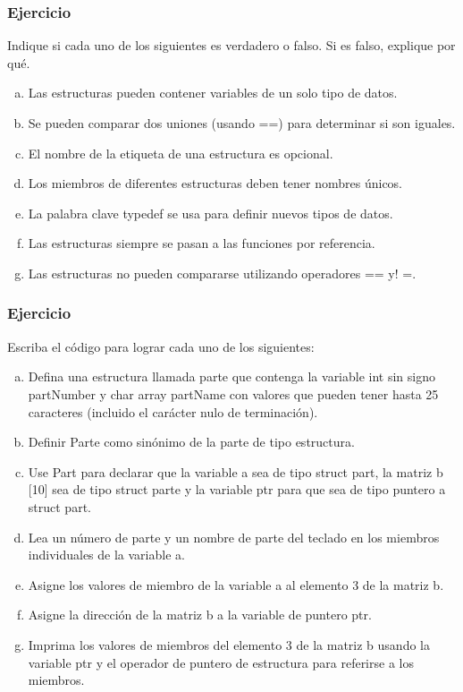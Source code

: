 \subsubsection{Ejercicio}
Indique si cada uno de los siguientes es verdadero o falso. Si es falso, explique por qué.
\begin{enumerate}[a)]
  \item Las estructuras pueden contener variables de un solo tipo de datos.
  \item Se pueden comparar dos uniones (usando ==) para determinar si son iguales.
  \item El nombre de la etiqueta de una estructura es opcional.
  \item Los miembros de diferentes estructuras deben tener nombres únicos.
  \item La palabra clave typedef se usa para definir nuevos tipos de datos.
  \item Las estructuras siempre se pasan a las funciones por referencia.
  \item Las estructuras no pueden compararse utilizando operadores == y! =.
\end{enumerate}

\subsubsection{Ejercicio}
Escriba el código para lograr cada uno de los siguientes:
\begin{enumerate}[a)]
  \item Defina una estructura llamada parte que contenga la variable int sin signo partNumber y char array partName con valores que pueden tener hasta 25 caracteres (incluido el carácter nulo de terminación).
  \item Definir Parte como sinónimo de la parte de tipo estructura.
  \item Use Part para declarar que la variable a sea de tipo struct part, la matriz b [10] sea de tipo struct parte y la variable ptr para que sea de tipo puntero a struct part.
  \item Lea un número de parte y un nombre de parte del teclado en los miembros individuales de la variable a.
  \item Asigne los valores de miembro de la variable a al elemento 3 de la matriz b.
  \item Asigne la dirección de la matriz b a la variable de puntero ptr.
  \item Imprima los valores de miembros del elemento 3 de la matriz b usando la variable ptr y el operador de puntero de estructura para referirse a los miembros.
\end{enumerate}
